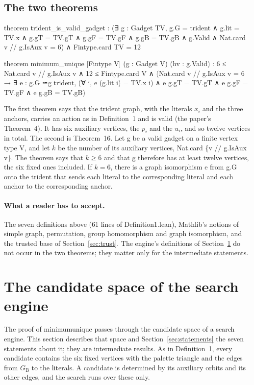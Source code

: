 \documentclass[11pt,a4paper]{article}
\newcommand{\leanus}{\textunderscore\allowbreak}
\newcommand{\lean}[1]{{\ttfamily\let\_\leanus #1}}
\newcommand{\GB}{G_{\mathrm{B}}}
\theoremstyle{definition}
\begin{document}
\subsection{The two theorems}
\begin{code}
theorem trident_is_valid_gadget :
    (∃ g : Gadget TV, g.G = trident ∧ g.lit = TV.x ∧ g.gT = TV.gT ∧
      g.gF = TV.gF ∧ g.gB = TV.gB ∧ g.Valid ∧
      Nat.card {v // g.IsAux v} = 6) ∧ Fintype.card TV = 12

theorem minimum_unique [Fintype V] (g : Gadget V) (hv : g.Valid) :
    6 ≤ Nat.card {v // g.IsAux v} ∧ 12 ≤ Fintype.card V ∧
    (Nat.card {v // g.IsAux v} = 6 → ∃ e : g.G ≃g trident,
      (∀ i, e (g.lit i) = TV.x i) ∧
      e g.gT = TV.gT ∧ e g.gF = TV.gF ∧ e g.gB = TV.gB)
\end{code}
The first theorem says that the trident graph, with the literals $x_i$ and
the three anchors, carries an action as in Definition~1 and is valid (the
paper's Theorem~4). It has six auxiliary vertices, the $p_i$ and the $u_i$,
and so twelve vertices in total. The second is Theorem~16. Let
\lean{g} be a valid gadget on a finite vertex type \lean{V}, and let $k$ be
the number of its auxiliary vertices, \lean{Nat.card \{v // g.IsAux v\}}.
The theorem says that $k\ge6$ and that \lean{g} therefore has at least twelve
vertices, the six fixed ones included. If $k=6$, there is a graph
isomorphism \lean{e} from \lean{g.G} onto the trident that sends each literal
to the corresponding literal and each anchor to the corresponding anchor.

\paragraph{What a reader has to accept.} The seven definitions above (61 lines
of \lean{Definition1.lean}), Mathlib's notions of simple graph, permutation,
group homomorphism and graph isomorphism, and the trusted base of
Section~\ref{sec:trust}. The engine's definitions of Section~\ref{sec:model}
do not occur in the two theorems; they matter only for the intermediate
statements.

\section{The candidate space of the search engine}\label{sec:model}

The proof of \lean{minimum\_unique} passes through the candidate space of a
search engine. This section describes that space and Section~\ref{sec:statements}
the seven statements about it; they are intermediate results. As in
Definition~1, every candidate contains the six fixed vertices with the
palette triangle and the edges from $\GB$ to the literals. A candidate is
determined by its auxiliary orbits and its other edges, and the search runs
over these only.
\end{document}
